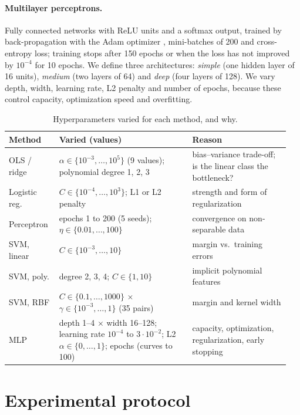 \documentclass{article}
\begin{document}
\paragraph{Multilayer perceptrons.} Fully connected networks with ReLU units and a softmax output, trained by back-propagation \citep{rumelhart1986learning} with the Adam optimizer \citep{kingma2015adam}, mini-batches of 200 and cross-entropy loss; training stops after 150 epochs or when the loss has not improved by $10^{-4}$ for 10 epochs. We define three architectures: \emph{simple} (one hidden layer of 16 units), \emph{medium} (two layers of 64) and \emph{deep} (four layers of 128). We vary depth, width, learning rate, L2 penalty and number of epochs, because these control capacity, optimization speed and overfitting.

\begin{table}[t]
  \caption{Hyperparameters varied for each method, and why.}
  \label{tab:hyper}
  \centering
  \footnotesize
  \begin{tabular}{@{}p{0.17\linewidth}p{0.45\linewidth}p{0.33\linewidth}@{}}
    \toprule
    Method & Varied (values) & Reason \\
    \midrule
    OLS / ridge & $\alpha\in\{10^{-3},\dots,10^{5}\}$ (9 values); polynomial degree 1, 2, 3 & bias--variance trade-off; is the linear class the bottleneck? \\
    Logistic reg. & $C\in\{10^{-4},\dots,10^{3}\}$; L1 or L2 penalty & strength and form of regularization \\
    Perceptron & epochs 1 to 200 (5 seeds); $\eta\in\{0.01,\dots,100\}$ & convergence on non-separable data \\
    SVM, linear & $C\in\{10^{-3},\dots,10\}$ & margin vs.\ training errors \\
    SVM, poly. & degree 2, 3, 4; $C\in\{1,10\}$ & implicit polynomial features \\
    SVM, RBF & $C\in\{0.1,\dots,1000\}$ $\times$ $\gamma\in\{10^{-3},\dots,1\}$ (35 pairs) & margin and kernel width \\
    MLP & depth 1--4 $\times$ width 16--128; learning rate $10^{-4}$ to $3{\cdot}10^{-2}$; L2 $\alpha\in\{0,\dots,1\}$; epochs (curves to 100) & capacity, optimization, regularization, early stopping \\
    \bottomrule
  \end{tabular}
\end{table}

\section{Experimental protocol}
\end{document}

